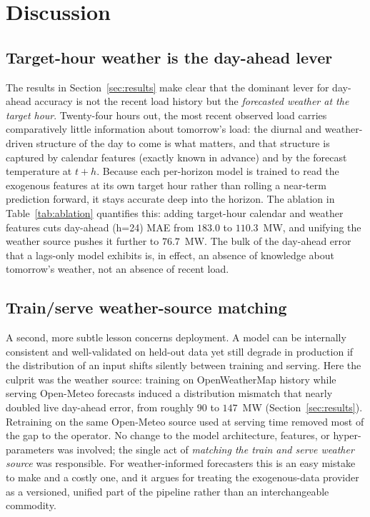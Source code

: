 \section{Discussion}\label{sec:discussion}

\subsection{Target-hour weather is the day-ahead lever}
The results in Section~\ref{sec:results} make clear that the dominant lever for
day-ahead accuracy is not the recent load history but the \emph{forecasted weather
at the target hour}. Twenty-four hours out, the most recent observed load carries
comparatively little information about tomorrow's load: the diurnal and weather-driven
structure of the day to come is what matters, and that structure is captured by
calendar features (exactly known in advance) and by the forecast temperature at
$t+h$. Because each per-horizon model is trained to read the exogenous features at its
own target hour rather than rolling a near-term prediction forward, it stays accurate
deep into the horizon. The ablation in Table~\ref{tab:ablation} quantifies this:
adding target-hour calendar and weather features cuts day-ahead (h=24) MAE from
$183.0$ to $110.3$~MW, and unifying the weather source pushes it further to
$76.7$~MW. The bulk of the day-ahead error that a lags-only model exhibits is, in
effect, an absence of knowledge about tomorrow's weather, not an absence of recent
load.

\subsection{Train/serve weather-source matching}
A second, more subtle lesson concerns deployment. A model can be internally
consistent and well-validated on held-out data yet still degrade in production if the
distribution of an input shifts silently between training and serving. Here the
culprit was the weather source: training on OpenWeatherMap history while serving
Open-Meteo forecasts induced a distribution mismatch that nearly doubled live
day-ahead error, from roughly $90$ to $147$~MW (Section~\ref{sec:results}). Retraining
on the same Open-Meteo source used at serving time removed most of the gap to the
operator. No change to the model architecture, features, or hyper-parameters was
involved; the single act of \emph{matching the train and serve weather source} was
responsible. For weather-informed forecasters this is an easy mistake to make and a
costly one, and it argues for treating the exogenous-data provider as a versioned,
unified part of the pipeline rather than an interchangeable commodity.

